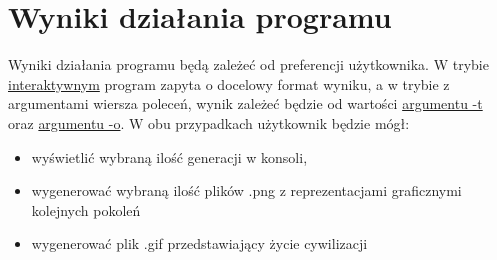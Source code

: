 \documentclass{report}
\begin{document}
\chapter{Wyniki działania programu}
Wyniki działania programu będą zależeć od preferencji użytkownika. W trybie \hyperref[interaktywny]{\textcolor{LinkColor}{interaktywnym}} program zapyta o docelowy format wyniku, a w trybie z argumentami wiersza poleceń, wynik zależeć będzie od wartości  \hyperref[output_args]{\textcolor{LinkColor}{argumentu -t}} oraz \hyperref[output_dest]{\textcolor{LinkColor}{argumentu -o}}. W obu przypadkach użytkownik będzie mógł:
\begin{itemize}
\item wyświetlić wybraną ilość generacji w konsoli,
\item wygenerować wybraną ilość plików .png z reprezentacjami graficznymi kolejnych pokoleń
\item wygenerować plik .gif przedstawiający życie cywilizacji
\end{itemize}
\end{document}

